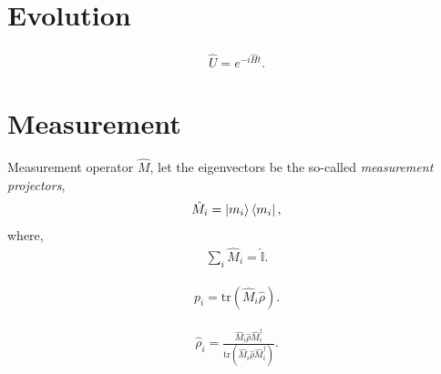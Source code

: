 \documentclass[aps,pra,twocolumn,amsmath,amssymb,nofootinbib,superscriptaddress]{revtex4}
\begin{document}
%
%

\section{Evolution}

\begin{align}
\hat{U} = e^{-i\hat{H}t}.	
\end{align}

%
%

\section{Measurement}

Measurement operator $\hat{M}$, let the eigenvectors be the so-called \textit{measurement projectors},
\begin{align}
\hat{M}_i = \ket{m_i}\bra{m_i},	
\end{align}
where,
\begin{align}
\sum_i \hat{M}_i = \hat{\mathbb{I}}.	
\end{align}

\begin{align}
p_i = \mathrm{tr}(\hat{M}_i\hat\rho).
\end{align}

\begin{align}
\hat\rho_i = \frac{\hat{M}_i\hat\rho\hat{M}_i^\dag}{\mathrm{tr}(\hat{M}_i\hat\rho\hat{M}_i^\dag)}.
\end{align}
\end{document}
